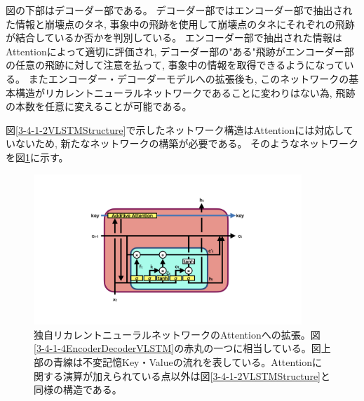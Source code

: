 図の下部はデコーダー部である。
デコーダー部ではエンコーダー部で抽出された情報と崩壊点のタネ, 事象中の飛跡を使用して崩壊点のタネにそれぞれの飛跡が結合しているか否かを判別している。
エンコーダー部で抽出された情報はAttentionによって適切に評価され, デコーダー部の"ある"飛跡がエンコーダー部の任意の飛跡に対して注意を払って, 事象中の情報を取得できるようになっている。
またエンコーダー・デコーダーモデルへの拡張後も, このネットワークの基本構造がリカレントニューラルネットワークであることに変わりはない為, 飛跡の本数を任意に変えることが可能である。

図\ref{3-4-1-2VLSTMStructure}で示したネットワーク構造はAttentionには対応していないため, 新たなネットワークの構築が必要である。
そのようなネットワークを図\ref{3-4-1-5AttentionVLSTM}に示す。

\begin{figure}[htbp]
 \centering
 \includegraphics[trim = 100 0 100 0, width=0.9\textwidth, clip]{Figure/3Networks/3-4-1-5AttentionVLSTM.png}
 \caption[独自リカレントニューラルネットワークのAttentionへの拡張]{独自リカレントニューラルネットワークのAttentionへの拡張。図\ref{3-4-1-4EncoderDecoderVLSTM}の赤丸の一つに相当している。図上部の青線は不変記憶Key・Valueの流れを表している。Attentionに関する演算が加えられている点以外は図\ref{3-4-1-2VLSTMStructure}と同様の構造である。}
 \label{3-4-1-5AttentionVLSTM}
\end{figure}

